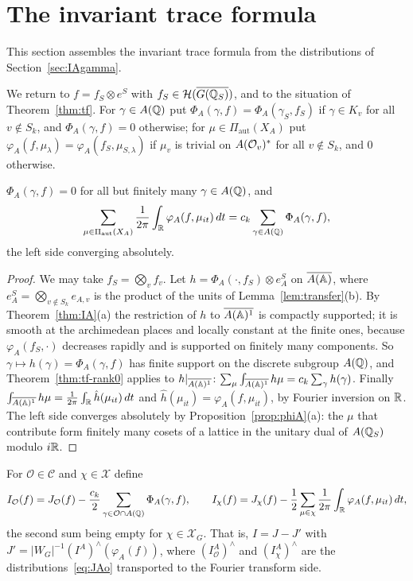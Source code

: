 \section{The invariant trace formula}\label{sec:itf}

This section assembles the invariant trace formula from the
distributions of Section~\ref{sec:IAgamma}.


We return to $f=f_S\otimes e^S$ with $f_S\in\mathcal H(\overline{G(\mathbb{Q}_S)})$, and to the
situation of Theorem~\ref{thm:tf}. For $\gamma\in A(\mathbb{Q})$ put
$\Phi_A(\gamma,f)=\Phi_A(\gamma_S,f_S)$ if $\gamma\in K_v$ for all
$v\notin S_k$, and $\Phi_A(\gamma,f)=0$ otherwise; for
$\mu\in\Pi_{\mathrm{aut}}(X_A)$ put $\varphi_A(f,\mu_\lambda)=\varphi_A(f_S,
\mu_{S,\lambda})$ if $\mu_v$ is trivial on $A(\mathcal{O}_v)^*$ for all
$v\notin S_k$, and $0$ otherwise.

\begin{lemma}\label{lem:poisson-phi}
$\Phi_A(\gamma,f)=0$ for all but finitely many $\gamma\in A(\mathbb{Q})$, and
\[
\sum_{\mu\in\Pi_{\mathrm{aut}}(X_A)}\frac1{2\pi}\int_{\mathbb{R}}\varphi_A(f,\mu_{it})
\,dt=c_k\sum_{\gamma\in A(\mathbb{Q})}\Phi_A(\gamma,f),
\]
the left side converging absolutely.
\end{lemma}

\begin{proof}
We may take $f_S=\bigotimes_vf_v$. Let $h=\Phi_A(\cdot,f_S)\otimes
e_A^S$ on $\overline{A(\mathbb{A})}$, where $e_A^S=\bigotimes_{v\notin S_k}e_{A,v}$
is the product of the units of Lemma~\ref{lem:transfer}(b). By
Theorem~\ref{thm:IA}(a) the restriction of $h$ to $\overline{A(\mathbb{A})^1}$ is
compactly supported; it is smooth at the archimedean places and locally
constant at the finite ones, because $\varphi_A(f_S,\cdot)$ decreases
rapidly and is supported on finitely many components. So
$\gamma\mapsto h(\gamma)=\Phi_A(\gamma,f)$ has finite support on the
discrete subgroup $A(\mathbb{Q})$, and Theorem~\ref{thm:tf-rank0} applies to
$h|_{\overline{A(\mathbb{A})^1}}$: $\sum_\mu\int_{\overline{A(\mathbb{A})^1}}h\mu=c_k
\sum_\gamma h(\gamma)$. Finally $\int_{\overline{A(\mathbb{A})^1}}h\mu=\frac1{2\pi}
\int_{\mathbb{R}}\hat h(\mu_{it})\,dt$ and $\hat h(\mu_{it})=\varphi_A(f,\mu_{it})$,
by Fourier inversion on $\mathbb{R}$. The left side converges absolutely by
Proposition~\ref{prop:phiA}(a): the $\mu$ that contribute form finitely
many cosets of a lattice in the unitary dual of $A(\mathbb{Q}_S)$ modulo
$i\mathbb{R}$.
\end{proof}

For $\mathcal O\in\mathcal C$ and $\chi\in\mathcal X$ define
\begin{equation}\label{eq:Iochi}
I_{\mathcal O}(f)=J_{\mathcal O}(f)-\frac{c_k}2\sum_{\gamma\in\mathcal O\cap
A(\mathbb{Q})}\Phi_A(\gamma,f),\qquad
I_\chi(f)=J_\chi(f)-\frac12\sum_{\mu\in\chi}\frac1{2\pi}\int_{\mathbb{R}}
\varphi_A(f,\mu_{it})\,dt,
\end{equation}
the second sum being empty for $\chi\in\mathcal X_G$. That is, $I=J-J'$
with
$J'=|W_G|^{-1}(I^A)^\wedge(\varphi_A(f))$, where $(I^A_{\mathcal O})^\wedge$
and $(I^A_\chi)^\wedge$ are the distributions~\eqref{eq:JAo} transported
to the Fourier transform side.

